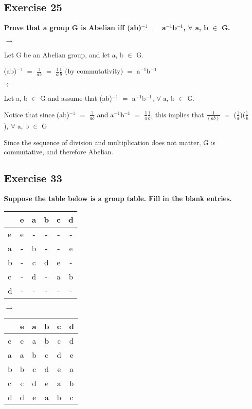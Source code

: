 \documentclass{article}
\newcommand{\mt}[1]{\ensuremath{#1}}
\newcommand\ssc[2][\DefaultOpt]{%
  \def\DefaultOpt{#2}%
  \subsection[#1]{#2}%
}
\newcommand{\fa}{\mt{\forall} }          %
\newcommand{\mem}{\mt{\in} }
\newcommand{\lra}{ \mt{\longrightarrow} } %
\newcommand{\lla}{ \mt{\longleftarrow} }  %
\newcommand{\eql}{\mt{=} }
\newcommand{\uf}[2]{#1\mt{^{#2}}}
\newcommand{\frc}[2]{\mt{\frac{#1}{#2}}}
\begin{document}
\ssc{Exercise 25}{

\textbf{Prove that a group G is Abelian iff \uf{(ab)}{-1} \eql \uf{a}{-1}\uf{b}{-1}, \fa a, b \mem G.}

\lra

Let G be an Abelian group, and let a, b \mem G.

\uf{(ab)}{-1} \eql \frc{1}{ab} \eql \frc{1}{a}\frc{1}{b} (by commutativity) \eql \uf{a}{-1}\uf{b}{-1} 

\lla

Let a, b \mem G and assume that \uf{(ab)}{-1} \eql \uf{a}{-1}\uf{b}{-1}, \fa a, b \mem G.

Notice that since \uf{(ab)}{-1} \eql \frc{1}{ab} and \uf{a}{-1}\uf{b}{-1} \eql \frc{1}{a}\frc{1}{b}, this implies that \frc{1}{(ab)} \eql (\frc{1}{a})(\frc{1}{b}), \fa a, b \mem G

Since the sequence of division and multiplication does not matter, G is commutative, and therefore Abelian.

}

\ssc{Exercise 33}{

\textbf{Suppose the table below is a group table. Fill in the blank entries.}

\begin{tabular}{l|ccccc}
  & e & a & b & c & d \\
  \hline
  e & e & - & - & - & - \\
  a & - & b & - & - & e \\
  b & - & c & d & e & -  \\
  c & - & d & - & a & b \\
  d & - & - & - & - & - 
\end{tabular}
\lra 
\begin{tabular}{l|ccccc}
  & e & a & b & c & d \\
  \hline
  e & e & a & b & c & d \\
  a & a & b & c & d & e \\
  b & b & c & d & e & a  \\
  c & c & d & e & a & b \\
  d & d & e & a & b & c 
\end{tabular}

}
\end{document}
